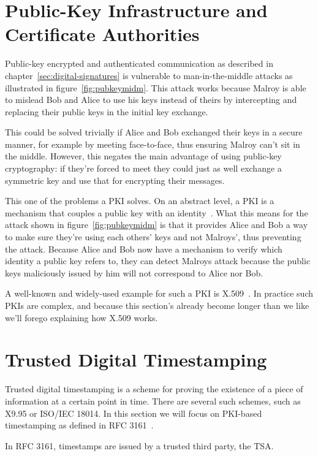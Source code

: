 \section{Public-Key Infrastructure and Certificate Authorities}\label{sec:public-key-infrastructure-and-certificate-authorities}
Public-key encrypted and authenticated communication as described in chapter~\ref{sec:digital-signatures}
is vulnerable to man-in-the-middle attacks as illustrated in figure~\ref{fig:pubkeymidm}.
This attack works because Malroy is able to mislead Bob and Alice to use his keys instead of theirs
by intercepting and replacing their public keys in the initial key exchange.

This could be solved trivially if Alice and Bob exchanged their keys in a secure manner,
for example by meeting face-to-face,
thus ensuring Malroy can't sit in the middle.
However, this negates the main advantage of using public-key cryptography:
if they're forced to meet they could just as well exchange a symmetric key and use that for encrypting
their messages.

This one of the problems a \gls{PKI} solves.
On an abstract level, a \gls{PKI} is a mechanism that couples a public key with an identity~\cite{whatispki}.
What this means for the attack shown in figure~\ref{fig:pubkeymidm} is that it provides Alice and Bob
a way to make sure they're using each others' keys and not Malroys',
thus preventing the attack.
Because Alice and Bob now have a mechanism to verify which identity a public key refers to,
they can detect Malroys attack because the public keys maliciously issued by him will not correspond to Alice nor Bob.

A well-known and widely-used example for such a \gls{PKI} is X.509~\cite{x509}.
In practice such \gls{PKI}s are complex,
and because this section's already become longer than we like we'll forego explaining how X.509 works.

\section{Trusted Digital Timestamping}\label{sec:timestamps}
Trusted digital timestamping is a scheme for proving the existence of a piece of information at a certain point in time.
There are several such schemes, such as X9.95 or ISO/IEC 18014.
In this section we will focus on \gls{PKI}-based timestamping as defined in \gls{RFC} 3161~\cite{rfc3161}.

In \gls{RFC} 3161, timestamps are issued by a trusted third party, the \acrfull{TSA}.

